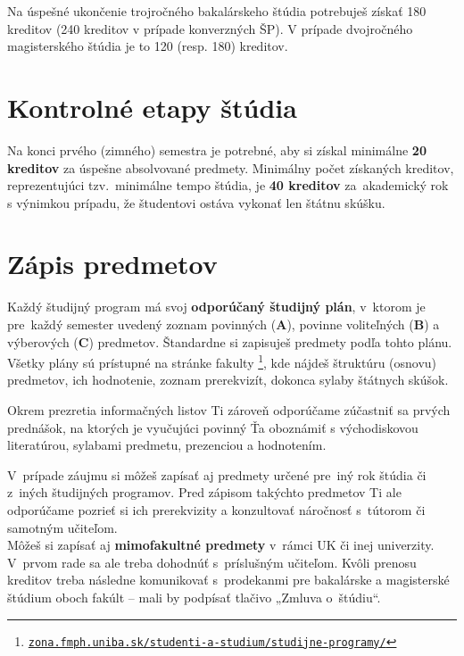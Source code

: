 Na úspešné ukončenie trojročného bakalárskeho štúdia potrebuješ získať
180 kreditov (240 kreditov v prípade konverzných ŠP). V prípade dvojročného magisterského štúdia je to 120 (resp. 180) kreditov.

\section{Kontrolné etapy štúdia}

Na konci prvého (zimného) semestra je potrebné, aby si získal minimálne \textbf{20 kreditov} za úspešne absolvované predmety. Minimálny počet získaných kreditov, reprezentujúci tzv.\ mi\-ni\-málne tempo štúdia, je \textbf{40 kreditov} za~akademický rok s výnimkou prípadu, že študentovi ostáva vykonať len štátnu skúšku.

\section{Zápis predmetov}

Každý študijný program má svoj \textbf{odporúčaný študijný plán},
v~ktorom je pre~každý semester uvedený zoznam povinných (\textbf{A}), povinne
voliteľných (\textbf{B}) a výberových (\textbf{C}) predmetov. Štandardne si zapisuješ predmety
podľa tohto plánu. Všetky plány sú prístupné na stránke fakulty%
\footnote{\href{https://zona.fmph.uniba.sk/studenti-a-studium/studijne-programy/}{\texttt{zona.fmph.uniba.sk/studenti-a-studium/studijne-programy/}}%
}, kde nájdeš štruktúru (osnovu) predmetov, ich hodnotenie, zoznam prerekvizít, dokonca sylaby štátnych skúšok. 

Okrem prezretia  informačných listov Ti zároveň odporúčame zúčastniť sa prvých prednášok, na ktorých je vyučujúci povinný Ťa oboznámiť s východiskovou literatúrou, sylabami predmetu, prezenciou a hodnotením.

V~prípade záujmu si môžeš zapísať aj predmety určené pre~iný rok
štúdia či z~iných študijných programov. Pred zápisom takýchto predmetov
Ti ale odporúčame pozrieť si ich prerekvizity a konzultovať náročnosť
s~tútorom či samotným učiteľom. \\

Môžeš si zapísať aj \textbf{mimofakultné predmety} v~rámci UK či
inej univerzity. V~prvom rade sa ale treba dohodnúť s~príslušným
učiteľom. Kvôli prenosu kreditov treba následne komunikovať s prodekanmi
pre bakalárske a magisterské štúdium oboch fakúlt -- mali by podpísať tlačivo
„Zmluva o~štúdiu“. \\

